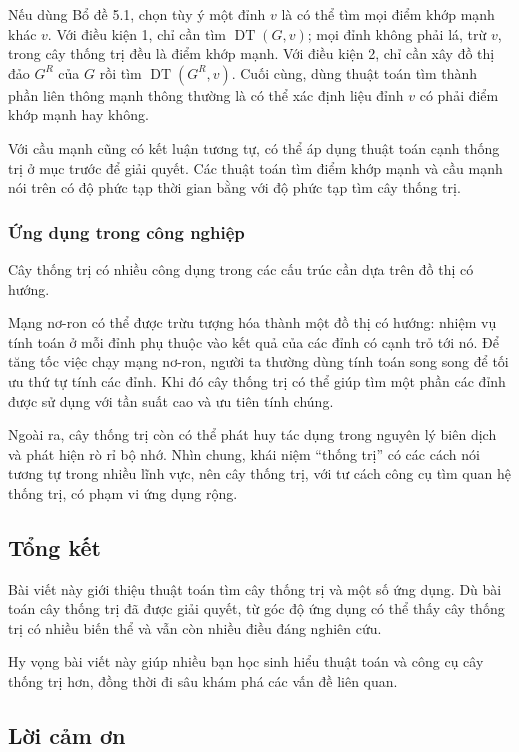 \documentclass[11pt]{article}
\begin{document}
Nếu dùng Bổ đề 5.1, chọn tùy ý một đỉnh \(v\) là có thể tìm mọi điểm khớp mạnh
khác \(v\). Với điều kiện 1, chỉ cần tìm \(\operatorname{DT}(G,v)\); mọi đỉnh
không phải lá, trừ \(v\), trong cây thống trị đều là điểm khớp mạnh. Với điều
kiện 2, chỉ cần xây đồ thị đảo \(G^R\) của \(G\) rồi tìm
\(\operatorname{DT}(G^R,v)\). Cuối cùng, dùng thuật toán tìm thành phần liên
thông mạnh thông thường là có thể xác định liệu đỉnh \(v\) có phải điểm khớp
mạnh hay không.

Với cầu mạnh cũng có kết luận tương tự, có thể áp dụng thuật toán cạnh thống
trị ở mục trước để giải quyết. Các thuật toán tìm điểm khớp mạnh và cầu mạnh
nói trên có độ phức tạp thời gian bằng với độ phức tạp tìm cây thống trị.

\subsubsection{Ứng dụng trong công nghiệp}

Cây thống trị có nhiều công dụng trong các cấu trúc cần dựa trên đồ thị có
hướng.

Mạng nơ-ron có thể được trừu tượng hóa thành một đồ thị có hướng: nhiệm vụ tính
toán ở mỗi đỉnh phụ thuộc vào kết quả của các đỉnh có cạnh trỏ tới nó. Để tăng
tốc việc chạy mạng nơ-ron, người ta thường dùng tính toán song song để tối ưu
thứ tự tính các đỉnh. Khi đó cây thống trị có thể giúp tìm một phần các đỉnh
được sử dụng với tần suất cao và ưu tiên tính chúng.

Ngoài ra, cây thống trị còn có thể phát huy tác dụng trong nguyên lý biên dịch
và phát hiện rò rỉ bộ nhớ. Nhìn chung, khái niệm ``thống trị'' có các cách nói
tương tự trong nhiều lĩnh vực, nên cây thống trị, với tư cách công cụ tìm quan
hệ thống trị, có phạm vi ứng dụng rộng.

\subsection{Tổng kết}

Bài viết này giới thiệu thuật toán tìm cây thống trị và một số ứng dụng. Dù bài
toán cây thống trị đã được giải quyết, từ góc độ ứng dụng có thể thấy cây thống
trị có nhiều biến thể và vẫn còn nhiều điều đáng nghiên cứu.

Hy vọng bài viết này giúp nhiều bạn học sinh hiểu thuật toán và công cụ cây
thống trị hơn, đồng thời đi sâu khám phá các vấn đề liên quan.

\subsection*{Lời cảm ơn}
\end{document}
